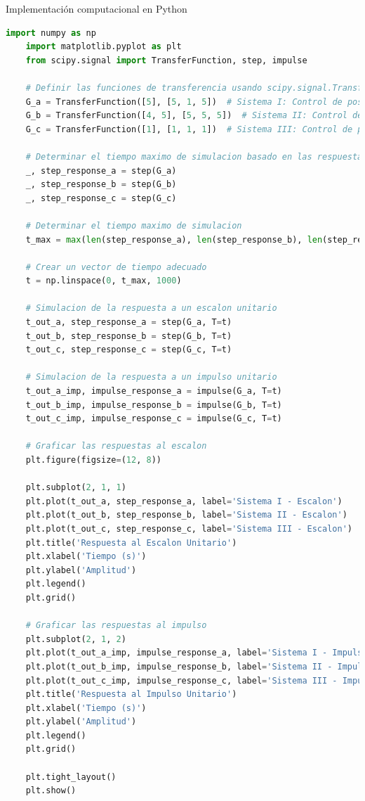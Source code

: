 \documentclass[10pt]{article}
\theoremstyle{definition}
\theoremstyle{remark}
\theoremstyle{definition}
\numberwithin{equation}{prob}
\begin{document}
Implementación computacional en Python
\begin{lstlisting}[language=Python]
	import numpy as np
	import matplotlib.pyplot as plt
	from scipy.signal import TransferFunction, step, impulse
	
	# Definir las funciones de transferencia usando scipy.signal.TransferFunction
	G_a = TransferFunction([5], [5, 1, 5])  # Sistema I: Control de posicion
	G_b = TransferFunction([4, 5], [5, 5, 5])  # Sistema II: Control de posicion con control PD
	G_c = TransferFunction([1], [1, 1, 1])  # Sistema III: Control de posicion con retroalimentacion de velocidad
	
	# Determinar el tiempo maximo de simulacion basado en las respuestas al escalon
	_, step_response_a = step(G_a)
	_, step_response_b = step(G_b)
	_, step_response_c = step(G_c)
	
	# Determinar el tiempo maximo de simulacion
	t_max = max(len(step_response_a), len(step_response_b), len(step_response_c))
	
	# Crear un vector de tiempo adecuado
	t = np.linspace(0, t_max, 1000)
	
	# Simulacion de la respuesta a un escalon unitario
	t_out_a, step_response_a = step(G_a, T=t)
	t_out_b, step_response_b = step(G_b, T=t)
	t_out_c, step_response_c = step(G_c, T=t)
	
	# Simulacion de la respuesta a un impulso unitario
	t_out_a_imp, impulse_response_a = impulse(G_a, T=t)
	t_out_b_imp, impulse_response_b = impulse(G_b, T=t)
	t_out_c_imp, impulse_response_c = impulse(G_c, T=t)
	
	# Graficar las respuestas al escalon
	plt.figure(figsize=(12, 8))
	
	plt.subplot(2, 1, 1)
	plt.plot(t_out_a, step_response_a, label='Sistema I - Escalon')
	plt.plot(t_out_b, step_response_b, label='Sistema II - Escalon')
	plt.plot(t_out_c, step_response_c, label='Sistema III - Escalon')
	plt.title('Respuesta al Escalon Unitario')
	plt.xlabel('Tiempo (s)')
	plt.ylabel('Amplitud')
	plt.legend()
	plt.grid()
	
	# Graficar las respuestas al impulso
	plt.subplot(2, 1, 2)
	plt.plot(t_out_a_imp, impulse_response_a, label='Sistema I - Impulso')
	plt.plot(t_out_b_imp, impulse_response_b, label='Sistema II - Impulso')
	plt.plot(t_out_c_imp, impulse_response_c, label='Sistema III - Impulso')
	plt.title('Respuesta al Impulso Unitario')
	plt.xlabel('Tiempo (s)')
	plt.ylabel('Amplitud')
	plt.legend()
	plt.grid()
	
	plt.tight_layout()
	plt.show()
\end{lstlisting}
\end{document}
